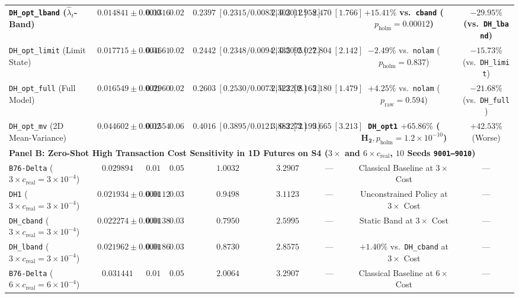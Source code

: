 \documentclass[11pt,a4paper]{article}
\begin{document}
\begin{table}[htbp]
{\begin{tabular}{lcccccccc}
    \textbf{\texttt{DH\_opt\_lband} ($\hat{\lambda}_t$-Band)} & $\mathbf{0.014841 \pm 0.001316}$ & $\mathbf{0.009953}$ & $\mathbf{0.026050}$ & $0.2397\ [0.2315/0.0083\ |\ 0.2012]$ & $2.303\ [1.958]$ & $2.470\ [1.766]$ & $\mathbf{+15.41\%}$ \textbf{vs.\ \texttt{cband} ($p_{\text{holm}}=0.00012$)} & $\mathbf{-29.95\%}$ \textbf{(vs.\ \texttt{DH\_lband})} \\
    \texttt{DH\_opt\_limit} (Limit State) & $0.017715 \pm 0.004661$ & $0.013359$ & $0.027305$ & $0.2442\ [0.2348/0.0094\ |\ 0.2095]$ & $2.335\ [2.027]$ & $2.804\ [2.142]$ & $-2.49\%$ vs.\ \texttt{nolam} ($p_{\text{holm}}=0.837$) & $-15.73\%$ (vs.\ \texttt{DH\_limit}) \\
    \texttt{DH\_opt\_full} (Full Model) & $0.016549 \pm 0.002960$ & $0.012265$ & $0.026300$ & $0.2603\ [0.2530/0.0073\ |\ 0.2208]$ & $2.523\ [2.165]$ & $2.180\ [1.479]$ & $+4.25\%$ vs.\ \texttt{nolam} ($p_{\text{raw}}=0.594$) & $-21.68\%$ (vs.\ \texttt{DH\_full}) \\
    \texttt{DH\_opt\_mv} (2D Mean-Variance) & $0.044602 \pm 0.001554$ & $0.029480$ & $0.068580$ & $0.4016\ [0.3895/0.0121\ |\ 0.3272]$ & $3.882\ [3.199]$ & $3.665\ [3.213]$ & \textbf{\texttt{DH\_opt1} $+65.86\%$ ($\mathbf{H_2}, p_{\text{holm}}=1.2\times 10^{-10}$)} & $+42.53\%$ (Worse) \\
    \midrule
    \multicolumn{9}{l}{\textbf{Panel B: Zero-Shot High Transaction Cost Sensitivity in 1D Futures on S4 ($3\times$ and $6\times c_{\text{real}}$, $10$ Seeds \texttt{9001--9010})}} \\
    \texttt{B76-Delta} ($3\times c_{\text{real}} = 3\times 10^{-4}$) & $0.029894$ & $0.016510$ & $0.057620$ & $1.0032$ & $3.2907$ & --- & Classical Baseline at $3\times$ Cost & --- \\
    \texttt{DH1} ($3\times c_{\text{real}} = 3\times 10^{-4}$) & $0.021934 \pm 0.000112$ & $0.014512$ & $0.037890$ & $0.9498$ & $3.1123$ & --- & Unconstrained Policy at $3\times$ Cost & --- \\
    \texttt{DH\_cband} ($3\times c_{\text{real}} = 3\times 10^{-4}$) & $0.022274 \pm 0.000138$ & $0.014980$ & $0.037810$ & $0.7950$ & $2.5995$ & --- & Static Band at $3\times$ Cost & --- \\
    \texttt{DH\_lband} ($3\times c_{\text{real}} = 3\times 10^{-4}$) & $0.021962 \pm 0.000186$ & $0.014710$ & $\mathbf{0.037420}$ & $0.8730$ & $2.8575$ & --- & $+1.40\%$ vs.\ \texttt{DH\_cband} at $3\times$ Cost & --- \\
    \texttt{B76-Delta} ($6\times c_{\text{real}} = 6\times 10^{-4}$) & $0.031441$ & $0.017980$ & $0.059180$ & $2.0064$ & $3.2907$ & --- & Classical Baseline at $6\times$ Cost & --- \\

\end{tabular}}
\end{table}
\end{document}
